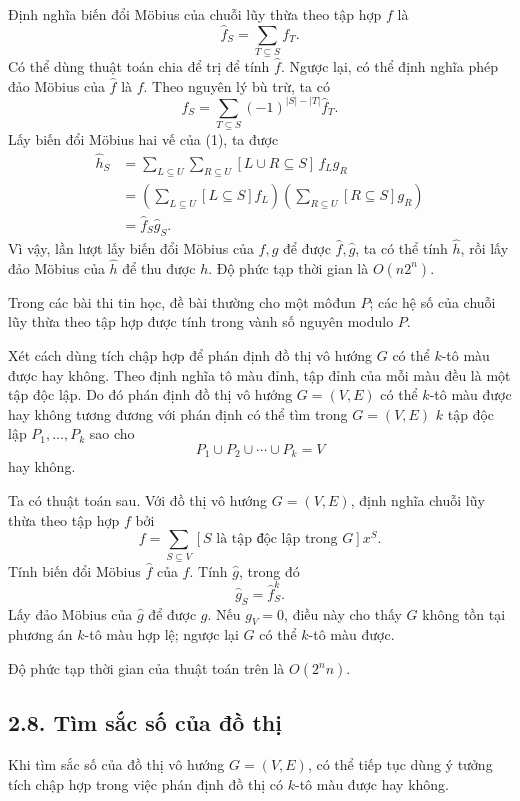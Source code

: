 \documentclass[11pt]{article}
\begin{document}
Định nghĩa biến đổi Möbius của chuỗi lũy thừa theo tập hợp \(f\) là
\[
  \widehat f_S=\sum_{T\subseteq S} f_T.
\]
Có thể dùng thuật toán chia để trị để tính \(\widehat f\). Ngược lại, có thể
định nghĩa phép đảo Möbius của \(\widehat f\) là \(f\). Theo nguyên lý bù trừ,
ta có
\[
  f_S=\sum_{T\subseteq S}(-1)^{|S|-|T|}\widehat f_T.
\]
Lấy biến đổi Möbius hai vế của (1), ta được
\[
\begin{aligned}
  \widehat h_S
  &=\sum_{L\subseteq U}\sum_{R\subseteq U}
      [L\cup R\subseteq S]\,f_L g_R\\
  &=\left(\sum_{L\subseteq U}[L\subseteq S]f_L\right)
    \left(\sum_{R\subseteq U}[R\subseteq S]g_R\right)\\
  &=\widehat f_S\widehat g_S.
\end{aligned}
\]
Vì vậy, lần lượt lấy biến đổi Möbius của \(f,g\) để được \(\widehat f,\widehat
g\), ta có thể tính \(\widehat h\), rồi lấy đảo Möbius của \(\widehat h\) để
thu được \(h\). Độ phức tạp thời gian là \(O(n2^n)\).

Trong các bài thi tin học, đề bài thường cho một môđun \(P\); các hệ số của
chuỗi lũy thừa theo tập hợp được tính trong vành số nguyên modulo \(P\).

Xét cách dùng tích chập hợp để phán định đồ thị vô hướng \(G\) có thể
\(k\)-tô màu được hay không. Theo định nghĩa tô màu đỉnh, tập đỉnh của mỗi màu
đều là một tập độc lập. Do đó phán định đồ thị vô hướng \(G=(V,E)\) có thể
\(k\)-tô màu được hay không tương đương với phán định có thể tìm trong
\(G=(V,E)\) \(k\) tập độc lập \(P_1,\ldots,P_k\) sao cho
\[
  P_1\cup P_2\cup\cdots\cup P_k=V
\]
hay không.

Ta có thuật toán sau. Với đồ thị vô hướng \(G=(V,E)\), định nghĩa chuỗi lũy
thừa theo tập hợp \(f\) bởi
\[
  f=\sum_{S\subseteq V}[S\text{ là tập độc lập trong }G]x^S.
\]
Tính biến đổi Möbius \(\widehat f\) của \(f\). Tính \(\widehat g\), trong đó
\[
  \widehat g_S=\widehat f_S^k.
\]
Lấy đảo Möbius của \(\widehat g\) để được \(g\). Nếu \(g_V=0\), điều này cho
thấy \(G\) không tồn tại phương án \(k\)-tô màu hợp lệ; ngược lại \(G\) có thể
\(k\)-tô màu được.

Độ phức tạp thời gian của thuật toán trên là \(O(2^n n)\).

\subsection*{2.8. Tìm sắc số của đồ thị}

Khi tìm sắc số của đồ thị vô hướng \(G=(V,E)\), có thể tiếp tục dùng ý tưởng
tích chập hợp trong việc phán định đồ thị có \(k\)-tô màu được hay không.
\end{document}
